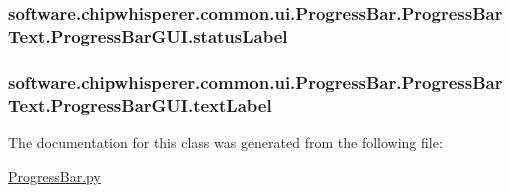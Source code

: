 \subsubsection[{status\+Label}]{\setlength{\rightskip}{0pt plus 5cm}software.\+chipwhisperer.\+common.\+ui.\+Progress\+Bar.\+Progress\+Bar\+Text.\+Progress\+Bar\+G\+U\+I.\+status\+Label}\label{classsoftware_1_1chipwhisperer_1_1common_1_1ui_1_1ProgressBar_1_1ProgressBarText_1_1ProgressBarGUI_a8b531d7c36146d8c95034d843865c744}
\hypertarget{classsoftware_1_1chipwhisperer_1_1common_1_1ui_1_1ProgressBar_1_1ProgressBarText_1_1ProgressBarGUI_a6fd33b46e1480e19484fba4f5116fc73}{}
\subsubsection[{text\+Label}]{\setlength{\rightskip}{0pt plus 5cm}software.\+chipwhisperer.\+common.\+ui.\+Progress\+Bar.\+Progress\+Bar\+Text.\+Progress\+Bar\+G\+U\+I.\+text\+Label}\label{classsoftware_1_1chipwhisperer_1_1common_1_1ui_1_1ProgressBar_1_1ProgressBarText_1_1ProgressBarGUI_a6fd33b46e1480e19484fba4f5116fc73}


The documentation for this class was generated from the following file\+:\begin{DoxyCompactItemize}
\item 
\hyperlink{ProgressBar_8py}{Progress\+Bar.\+py}\end{DoxyCompactItemize}
